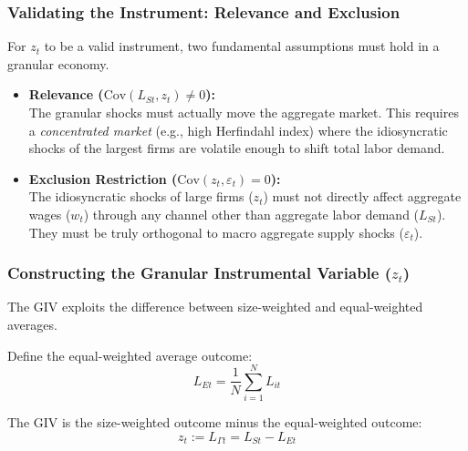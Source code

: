 \documentclass[aspectratio=169,11pt]{beamer}
\begin{document}
\begin{frame}
    \frametitle{Validating the Instrument: Relevance and Exclusion}

    \vspace{0.3cm}
    {\Large
        For $z_t$ to be a valid instrument, two fundamental assumptions must hold in a granular economy.
    }

    \vspace{0.8cm}
    \begin{itemize}
        \item \textbf{Relevance ($\text{Cov}(L_{St}, z_t) \neq 0$):}\\
              \vspace{0.2cm}
              The granular shocks must actually move the aggregate market. This requires a \emph{concentrated market} (e.g., high Herfindahl index) where the idiosyncratic shocks of the largest firms are volatile enough to shift total labor demand.

              \vspace{0.6cm}
        \item \textbf{Exclusion Restriction ($\text{Cov}(z_t, \varepsilon_t) = 0$):}\\
              \vspace{0.2cm}
              The idiosyncratic shocks of large firms ($z_t$) must not directly affect aggregate wages ($w_t$) through any channel other than aggregate labor demand ($L_{St}$). They must be truly orthogonal to macro aggregate supply shocks ($\varepsilon_t$).
    \end{itemize}

\end{frame}

\begin{frame}
    \frametitle{Constructing the Granular Instrumental Variable ($z_t$)}

    \vspace{0.5cm}
    {\Large
        The GIV exploits the difference between size-weighted and equal-weighted averages.
    }

    \vspace{1cm}
    Define the equal-weighted average outcome:
    \begin{equation*}
        L_{Et} = \frac{1}{N} \sum_{i=1}^N L_{it}
    \end{equation*}

    \vspace{0.5cm}
    The GIV is the size-weighted outcome minus the equal-weighted outcome:
    \begin{equation}
        z_t := L_{\Gamma t} = L_{St} - L_{Et} \tag{40}
    \end{equation}

\end{frame}
\end{document}
